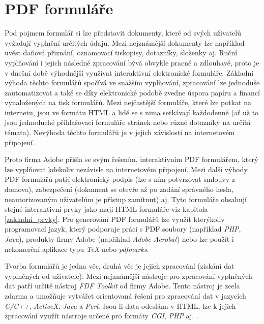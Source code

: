 	\section{PDF formuláře}
Pod pojmem formulář si lze představit dokumenty, které od svých uživatelů vyžadují vyplnění určitých údajů. Mezi nejznámější dokumenty lze například uvést daňová přiznání, oznamovací tiskopisy, dotazníky, složenky aj. Ruční vyplňování i jejich následné zpracování bývá obvykle pracné a zdlouhavé, proto je v dnešní době výhodnější využívat interaktivní elektronické formuláře. Základní výhoda těchto formulářů spočívá ve snažším vyplňování, zpracování lze jednoduše zautomatizovat a také se díky elektronické podobě zvedne úspora papíru a financí vynaložených na tisk formulářů.  Mezi nejčastější formuláře, které lze potkat na internetu, jsou ve formátu HTML a lidé se s nima setkávají každodenně (ať už to jsou jednoduché přihlašovací formuláře stránek nebo různé dotazníky na určitá témata). Nevýhoda těchto formulářů je v jejich závislosti na internetovém připojení. 
\par
Proto firma Adobe přišla se svým řešením, interaktivním PDF formulářem, který lze vyplňovat kdekoliv nezávisle na internetovém připojení. Mezi další výhody PDF formulářů patří elektronický podpis (lze s ním potvrzovat smlouvy z domova), zabezpečení (dokument se otevře až po zadání správného hesla, neautorizovaným uživatelům je přístup zamítnut) aj. Tyto formuláře obsahují stejné interaktivní prvky jako mají HTML formuláře viz kapitola \ref{zakladni_prvky}. Pro generování PDF formulářů lze využít kterýkoliv programovací jazyk, který podporuje práci s PDF soubory (například \textit{PHP}, \textit{Java}), produkty firmy Adobe (například \textit{Adobe Acrobat}) nebo lze použít i nekomerční aplikace typu \textit{TeX} nebo \textit{pdfmarks}.
\par
Tvorba formulářů je jedna věc, druhá věc je jejich zpracování (získání dat vyplněných od uživatele). Mezi nejznámější nástroje pro zpracování vyplněných dat patří určitě nástroj \textit{FDF Toolkit} od firmy Adobe. Tento nástroj je zcela zdarma a umožňuje vytvářet orientovaná řešení pro zpracování dat v jazycích \textit{C/C++}, \textit{ActiveX}, \textit{Java} a \textit{Perl}. Jsou-li data odeslána v HTML, lze k jejich zpracování využít nástroje určené pro formáty \textit{CGI}, \textit{PHP} aj. \cite{PDFForm}.
